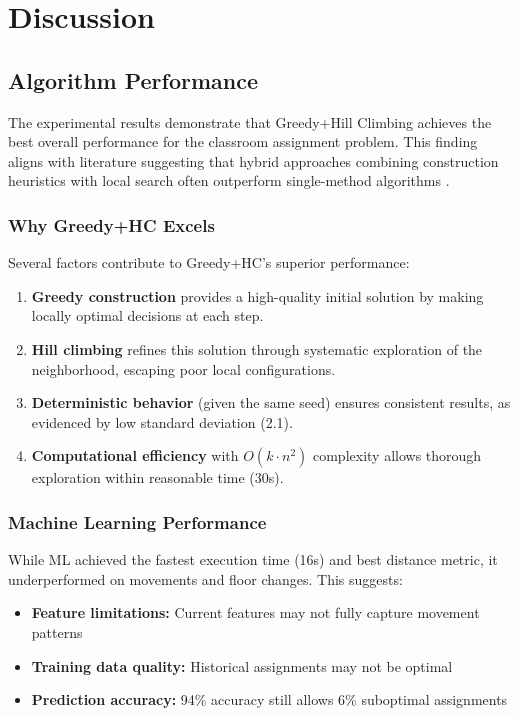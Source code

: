 \documentclass[algorithms,article,submit,pdftex,moreauthors]{Definitions/mdpi}
\begin{document}
\section{Discussion}

\subsection{Algorithm Performance}

The experimental results demonstrate that Greedy+Hill Climbing achieves the best overall performance for the classroom assignment problem. This finding aligns with literature suggesting that hybrid approaches combining construction heuristics with local search often outperform single-method algorithms \citep{ref-burke2013}.

\subsubsection{Why Greedy+HC Excels}

Several factors contribute to Greedy+HC's superior performance:

\begin{enumerate}
\item \textbf{Greedy construction} provides a high-quality initial solution by making locally optimal decisions at each step.
\item \textbf{Hill climbing} refines this solution through systematic exploration of the neighborhood, escaping poor local configurations.
\item \textbf{Deterministic behavior} (given the same seed) ensures consistent results, as evidenced by low standard deviation (2.1).
\item \textbf{Computational efficiency} with $O(k \cdot n^2)$ complexity allows thorough exploration within reasonable time (30s).
\end{enumerate}

\subsubsection{Machine Learning Performance}

While ML achieved the fastest execution time (16s) and best distance metric, it underperformed on movements and floor changes. This suggests:

\begin{itemize}
\item \textbf{Feature limitations:} Current features may not fully capture movement patterns
\item \textbf{Training data quality:} Historical assignments may not be optimal
\item \textbf{Prediction accuracy:} 94\% accuracy still allows 6\% suboptimal assignments
\end{itemize}
\end{document}
